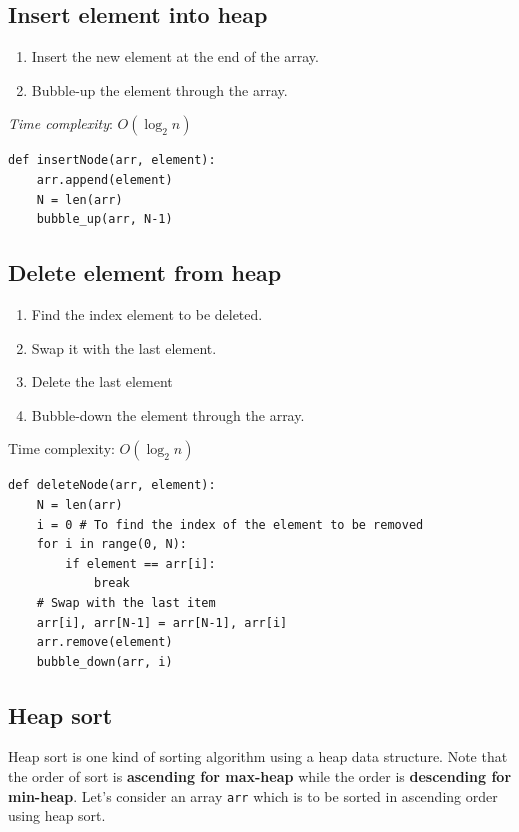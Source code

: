 \documentclass[a4paper,11pt]{book}
\begin{document}
\subsection{Insert element into heap}
\begin{enumerate}
    \item Insert the new element at the end of the array.
    \item Bubble-up the element through the array.
\end{enumerate}
\noindent \textit{Time complexity}: $O(\log_2 n)$
\begin{lstlisting}
def insertNode(arr, element):
    arr.append(element)
    N = len(arr)
    bubble_up(arr, N-1)
\end{lstlisting}

\subsection{Delete element from heap}
\begin{enumerate}
    \item Find the index element to be deleted.
    \item Swap it with the last element.
    \item Delete the last element
    \item Bubble-down the element through the array.
\end{enumerate}
\noindent Time complexity: $O(\log_2 n)$
\begin{lstlisting}
def deleteNode(arr, element):
    N = len(arr)
    i = 0 # To find the index of the element to be removed
    for i in range(0, N):
        if element == arr[i]:
            break
    # Swap with the last item
    arr[i], arr[N-1] = arr[N-1], arr[i]
    arr.remove(element)
    bubble_down(arr, i)
\end{lstlisting}

\subsection{Heap sort}

\noindent Heap sort is one kind of sorting algorithm using a heap data structure. Note that the order of sort is \textbf{ascending for max-heap} while the order is \textbf{descending for min-heap}. Let's consider an array \lstinline{arr} which is to be sorted in ascending order using heap sort.
\end{document}
